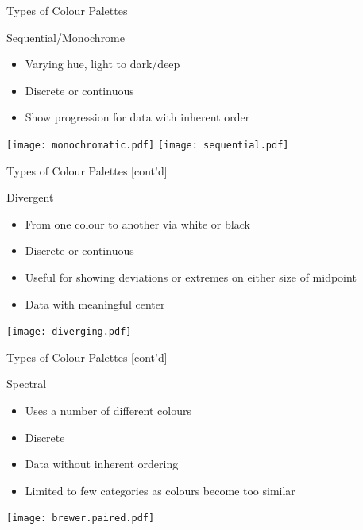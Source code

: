 \documentclass[ignorenonframetext,xcolor=x11names]{beamer}
\begin{document}
\begin{frame}{Types of Colour Palettes}
\begin{block}{Sequential/Monochrome}
\begin{itemize}
  \item Varying hue, light to dark/deep
  \item Discrete or continuous
  \item Show progression for data with inherent order
\end{itemize}
\begin{center}
  \texttt{[image: monochromatic.pdf]}
  \texttt{[image: sequential.pdf]}
\end{center}
\end{block}
\end{frame}

\begin{frame}{Types of Colour Palettes \small [cont'd]}
\begin{block}{Divergent}
\begin{itemize}
  \item From one colour to another via white or black
  \item Discrete or continuous
  \item Useful for showing deviations or extremes on either size of midpoint
  \item Data with meaningful center
\end{itemize}
\begin{center}
  \texttt{[image: diverging.pdf]}
\end{center}
\end{block}
\end{frame}

\begin{frame}{Types of Colour Palettes \small [cont'd]}
\begin{block}{Spectral}
\begin{itemize}
  \item Uses a number of different colours
  \item Discrete
  \item Data without inherent ordering
  \item Limited to few categories as colours become too similar
\end{itemize}
\begin{center}
  \texttt{[image: brewer.paired.pdf]}
\end{center}
\end{block}
\end{frame}
\end{document}
